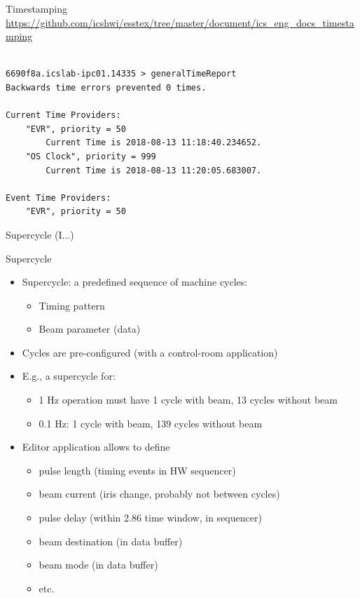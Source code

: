 \documentclass[
  9pt
  , table
  , ignorenonframetext
]{beamer}
\begin{document}
\begin{frame}[fragile]{Timestamping}
\url{https://github.com/icshwi/esstex/tree/master/document/ics_eng_docs_timestamping}
\begin{lstlisting}[style=termstyle,breaklines=true,basicstyle=\scriptsize]

6690f8a.icslab-ipc01.14335 > generalTimeReport
Backwards time errors prevented 0 times.

Current Time Providers:
    "EVR", priority = 50
        Current Time is 2018-08-13 11:18:40.234652.
    "OS Clock", priority = 999
        Current Time is 2018-08-13 11:20:05.683007.

Event Time Providers:
    "EVR", priority = 50

\end{lstlisting}
\end{frame}

\begin{frame}{Supercycle (I...)}
  \begin{block}{Supercycle}
    \begin{itemize}
      \item Supercycle: a predefined sequence of machine cycles:
      \begin{itemize}
        \item Timing pattern
        \item Beam parameter (data)
      \end{itemize}
      \item Cycles are pre-configured (with a control-room application)
      \item E.g., a supercycle for:
      \begin{itemize}
        \item 1 Hz operation must have 1 cycle with beam, 13 cycles without beam
        \item 0.1 Hz: 1 cycle with beam,  139 cycles without beam
      \end{itemize}
      \item Editor application allows to define
      \begin{itemize}
        \item pulse length (timing events in HW sequencer)
        \item beam current (iris change, probably not between cycles)
        \item pulse delay (within 2.86 time window, in sequencer)
        \item beam destination (in data buffer)
        \item beam mode (in data buffer)
        \item etc.
      \end{itemize}
    \end{itemize}
  \end{block}
\end{frame}
\end{document}
